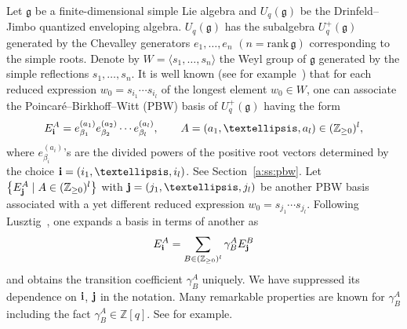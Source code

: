 \documentclass[11pt]{article}
\newcommand{\geh}{\mathfrak{g}}
\newcommand{\Z}{{\mathbb Z}}
\begin{document}
Let $\geh$ be a f\/inite-dimensional simple Lie algebra and
$U_q(\geh)$ be the Drinfeld--Jimbo quantized enveloping algebra.
$U_q(\geh)$ has the subalgebra $U^+_q(\geh)$ generated by the
Chevalley generators $e_1,\ldots, e_n$   $(n= \mathrm{rank}\, \geh)$
corresponding to the simple roots.
Denote by $W=\langle s_1,\ldots, s_n\rangle$ the
Weyl group of $\geh$ generated by the simple ref\/lections $s_1,\ldots, s_n$.
It is well known (see for example~\cite{L2}) that
for each reduced expression $w_0 = s_{i_1}\cdots s_{i_l}$
of the longest element $w_0 \in W$,
one can associate the Poincar\'e--Birkhof\/f--Witt (PBW) basis
of $U^+_q(\geh)$ having the form
\begin{gather*}
E_{\bf i}^A=e_{\beta_1}^{(a_1)}e_{\beta_2}^{(a_2)}\cdots e_{\beta_l}^{(a_l)},
\qquad
A=(a_1,\ldots, a_l) \in (\Z_{\ge 0})^l,
\end{gather*}
where $e^{(a_i)}_{\beta_i}$'s are the divided powers of the positive root
vectors determined by the choice ${\bf i}= (i_1,\ldots, i_l)$.
See Section~\ref{a:ss:pbw}.
Let $\big\{E^A_{\bf j}\mid A \in (\Z_{\ge 0})^l\big\}$ with
${\bf j} = (j_1,\ldots, j_l)$ be another
PBW basis associated with a yet dif\/ferent reduced expression
$w_0 = s_{j_1}\cdots s_{j_l}$.
Following Lusztig~\cite{L}, one expands
a basis in terms of another as
\begin{gather*}
E^A_{\bf i} = \sum_{B \in (\Z_{\ge 0})^l}
\gamma^A_B E^B_{\bf j}
\end{gather*}
and obtains the
transition coef\/f\/icient $\gamma^A_B$ uniquely.
We have suppressed its dependence on ${\bf i}$, ${\bf j}$
in the notation.
Many remarkable properties are known for $\gamma^A_B$
including the fact $\gamma^A_B \in \Z[q]$.
See \cite[Proposition~2.3]{L} for example.
\end{document}
